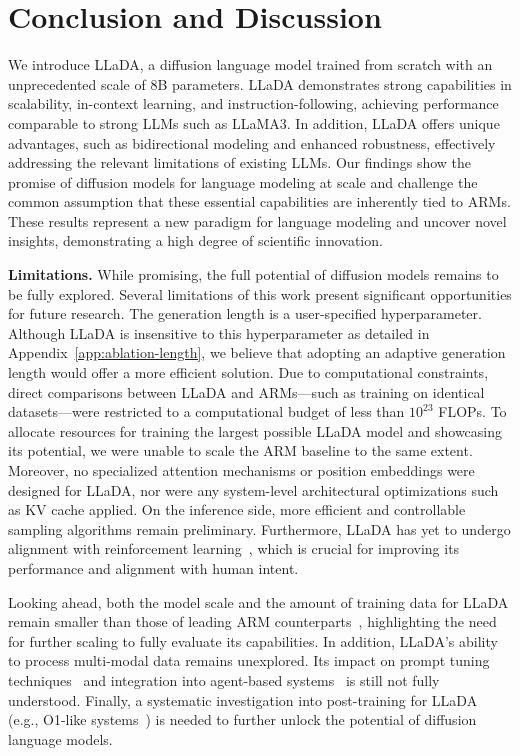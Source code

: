 \documentclass{article}
\begin{document}
\section{Conclusion and Discussion}
\label{sec:conclusion}
We introduce LLaDA, a diffusion language model trained from scratch with an unprecedented scale of 8B parameters. LLaDA demonstrates strong capabilities in scalability,  in-context learning, and instruction-following, achieving performance comparable to strong LLMs such as LLaMA3. In addition, LLaDA offers unique advantages, such as bidirectional modeling and enhanced robustness, effectively addressing the relevant limitations of existing LLMs. Our findings show the promise of diffusion models for language modeling at scale and challenge the common assumption that these essential capabilities are inherently tied to ARMs. These results represent a new paradigm for language modeling and uncover novel insights, demonstrating a high degree of scientific innovation.

\textbf{Limitations.} While promising, the full potential of diffusion models remains to be fully explored. Several limitations of this work present significant opportunities for future research. The generation length is a user-specified hyperparameter. Although LLaDA is insensitive to this hyperparameter as detailed in Appendix~\ref{app:ablation-length}, we believe that adopting an adaptive generation length would offer a more efficient solution. Due to computational constraints, direct comparisons between LLaDA and ARMs---such as training on identical datasets---were restricted to a computational budget of less than $10^{23}$ FLOPs. To allocate resources for training the largest possible LLaDA model and showcasing its potential, we were unable to scale the ARM baseline to the same extent. Moreover, no specialized attention mechanisms or position embeddings were designed for LLaDA, nor were any system-level architectural optimizations such as KV cache applied. On the inference side, more efficient and controllable~\citep{ho2022classifier, dhariwal2021diffusion, schiff2024simple} sampling algorithms remain preliminary. Furthermore, LLaDA has yet to undergo alignment with reinforcement learning~\citep{ouyang2022training,rafailov2024direct}, which is crucial for improving its performance and alignment with human intent.

Looking ahead, both the model scale and the amount of training data for LLaDA remain smaller than those of leading ARM counterparts~\citep{dubey2024llama,qwen2.5, achiam2023gpt,gemini1_5,claude35sonnet,liu2024deepseek}, highlighting the need for further scaling to fully evaluate its capabilities. In addition, LLaDA's ability to process multi-modal data remains unexplored. Its impact on prompt tuning techniques~\citep{wei2022chain} and integration into agent-based systems~\citep{park2023generative,wang2024survey} is still not fully understood. Finally, a systematic investigation into post-training for LLaDA (e.g., O1-like systems~\citep{o1,guo2025deepseek}) is needed to further unlock the potential of diffusion language models.
\end{document}

